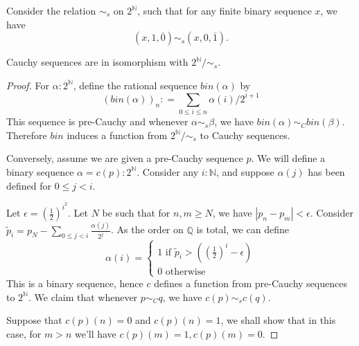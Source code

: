%
%
Consider the relation $\sim_s$ on $2^{\mathbb N}$, 
such that for any finite binary sequence $x$, we have 
$$(x,1,\overline 0) \sim_s (x ,0, \overline 1).$$
\begin{proposition}
  Cauchy sequences are in isomorphism with $2^\mathbb N / \sim_s$. 
\end{proposition} 
\begin{proof}
  For $\alpha: 2^\mathbb N$, define the rational sequence $bin(\alpha)$ by 
  \begin{equation} (bin (\alpha))_n :  = \sum\limits_{0 \leq i \leq n} \alpha(i) / 2^{i+1}\end{equation}  
  This sequence is pre-Cauchy and whenever $\alpha\sim_s \beta$, we have 
  $bin(\alpha) \sim_C bin(\beta)$. 
  Therefore $bin$ induces a function from $2^\mathbb N / \sim_s$ to Cauchy sequences. 
  
  \medskip 

  Conversely, assume we are given a pre-Cauchy sequence $p$. 
  We will define a binary sequence $\alpha  = c(p): 2^\mathbb N$.
  Consider any $i:\mathbb N$, and suppose $\alpha(j)$ has been defined for $0 \leq j<i$. 

  Let $\epsilon = (\frac12)^{i^2}$. %
  Let $N$ be such that for $n,m \geq N$, we have $|p_n - p_m| < \epsilon$. 
  Consider $\widetilde p_i = p_N - \sum\limits_{0\leq j < i} \frac {\alpha(j)}{2^j}$.
  As the order on $\mathbb Q$ is total, we can define 
  \begin{equation}
    \alpha(i) = \begin{cases}
    1 \text{ if } \widetilde p_i > ((\frac12)^{i} - \epsilon) \\
    0 \text{ otherwise } 
    \end{cases} 
  \end{equation}  
  This is a binary sequence, hence $c$ defines a function from pre-Cauchy sequences to $2^\mathbb N$.
  We claim that whenever $p \sim_C q$, we have $c(p) \sim_s c(q)$. 

  Suppose that $c(p)(n) = 0$ and $c(p)(n) = 1$, we shall show that in this case, 
  for $m > n$ we'll have $c(p)(m) =1 , c(p)(m) = 0$. 

\end{proof}


